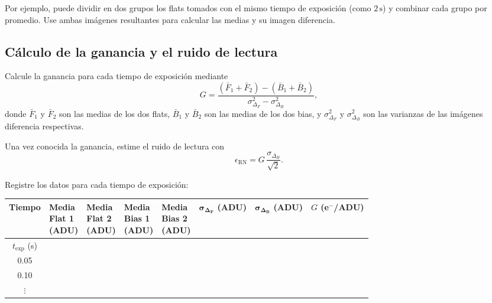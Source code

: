 \documentclass[12pt,a4paper]{article}
\begin{document}
Por ejemplo, puede dividir en dos grupos los flats tomados con el mismo tiempo
de exposición (como $2\,\mathrm{s}$) y combinar cada grupo por promedio. Use
ambas imágenes resultantes para calcular las medias y su imagen diferencia.

\subsection{Cálculo de la ganancia y el ruido de lectura}

Calcule la ganancia para cada tiempo de exposición mediante
\begin{equation}
    G = \frac{(\bar{F}_1 + \bar{F}_2) - (\bar{B}_1 + \bar{B}_2)}
    {\sigma^2_{\Delta_F} - \sigma^2_{\Delta_B}},
    \label{eq:gain}
\end{equation}
donde $\bar{F}_1$ y $\bar{F}_2$ son las medias de los dos flats,
$\bar{B}_1$ y $\bar{B}_2$ son las medias de los dos bias, y
$\sigma^2_{\Delta_F}$ y $\sigma^2_{\Delta_B}$ son las varianzas de las
imágenes diferencia respectivas.

Una vez conocida la ganancia, estime el ruido de lectura con
\begin{equation}
    \epsilon_{\text{RN}} = G\,\frac{\sigma_{\Delta_B}}{\sqrt{2}}.
    \label{eq:read-noise}
\end{equation}

Registre los datos para cada tiempo de exposición:

\begin{center}
\scriptsize
\setlength{\tabcolsep}{3pt}
\renewcommand{\arraystretch}{1.3}
\begin{tabularx}{\textwidth}{|c|*{7}{>{\centering\arraybackslash}X|}}
    \hline
    \textbf{Tiempo} &
    \shortstack{\textbf{Media}\\\textbf{Flat 1}\\\textbf{(ADU)}} &
    \shortstack{\textbf{Media}\\\textbf{Flat 2}\\\textbf{(ADU)}} &
    \shortstack{\textbf{Media}\\\textbf{Bias 1}\\\textbf{(ADU)}} &
    \shortstack{\textbf{Media}\\\textbf{Bias 2}\\\textbf{(ADU)}} &
    \shortstack{$\boldsymbol{\sigma_{\Delta_F}}$\\\textbf{(ADU)}} &
    \shortstack{$\boldsymbol{\sigma_{\Delta_B}}$\\\textbf{(ADU)}} &
    \shortstack{\textbf{$G$}\\\textbf{(e$^-$/ADU)}} \\
    \hline
    $t_{\text{exp}}$ (s) & & & & & & & \\
    \hline
    0.05 & & & & & & & \\
    \hline
    0.10 & & & & & & & \\
    \hline
    $\vdots$ & & & & & & & \\
    \hline
\end{tabularx}
\end{center}
\end{document}
